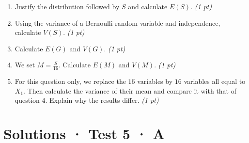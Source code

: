\begin{enumerate}

\item Justify the distribution followed by $S$ and calculate $E(S)$. \hfill\textit{(1 pt)}

\item Using the variance of a Bernoulli random variable and independence, calculate $V(S)$. \hfill\textit{(1 pt)}

\item Calculate $E(G)$ and $V(G)$. \hfill\textit{(1 pt)}

\item We set $M=\frac S{16}$. Calculate $E(M)$ and $V(M)$. \hfill\textit{(1 pt)}

\item For this question only, we replace the $16$ variables by $16$ variables all equal to $X_1$. Then calculate the variance of their mean and compare it with that of question 4. Explain why the results differ. \hfill\textit{(1 pt)}

\end{enumerate}

\ifprof\clearpage

\section*{Solutions · Test 5 · A}\label{cor:7-3}

